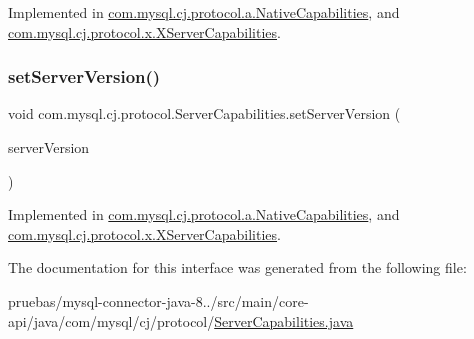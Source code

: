 Implemented in \mbox{\hyperlink{classcom_1_1mysql_1_1cj_1_1protocol_1_1a_1_1_native_capabilities_a15278c5085a8bc602e70df6edda8ac80}{com.\+mysql.\+cj.\+protocol.\+a.\+Native\+Capabilities}}, and \mbox{\hyperlink{classcom_1_1mysql_1_1cj_1_1protocol_1_1x_1_1_x_server_capabilities_af05db5189b56c0a947fe82332ba6e328}{com.\+mysql.\+cj.\+protocol.\+x.\+X\+Server\+Capabilities}}.

\mbox{\label{interfacecom_1_1mysql_1_1cj_1_1protocol_1_1_server_capabilities_a4474ed857120dcbd9148d3b94e2962ac}} 
\subsubsection{\texorpdfstring{set\+Server\+Version()}{setServerVersion()}}
{\footnotesize\ttfamily void com.\+mysql.\+cj.\+protocol.\+Server\+Capabilities.\+set\+Server\+Version (\begin{DoxyParamCaption}\item[{\mbox{\hyperlink{classcom_1_1mysql_1_1cj_1_1_server_version}{Server\+Version}}}]{server\+Version }\end{DoxyParamCaption})}



Implemented in \mbox{\hyperlink{classcom_1_1mysql_1_1cj_1_1protocol_1_1a_1_1_native_capabilities_a9785f3b62dcfb7fef17a97d74510c5fa}{com.\+mysql.\+cj.\+protocol.\+a.\+Native\+Capabilities}}, and \mbox{\hyperlink{classcom_1_1mysql_1_1cj_1_1protocol_1_1x_1_1_x_server_capabilities_a352b240088439d6dff829d1f0a879d96}{com.\+mysql.\+cj.\+protocol.\+x.\+X\+Server\+Capabilities}}.



The documentation for this interface was generated from the following file\+:\begin{DoxyCompactItemize}
\item 
pruebas/mysql-\/connector-\/java-\/8../src/main/core-\/api/java/com/mysql/cj/protocol/\mbox{\hyperlink{_server_capabilities_8java}{Server\+Capabilities.\+java}}\end{DoxyCompactItemize}

